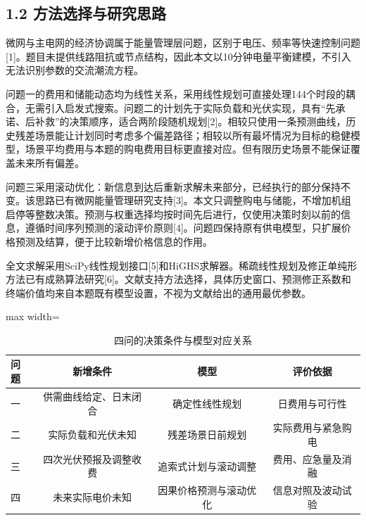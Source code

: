 \documentclass[UTF8,a4paper,zihao=-4,fontset=windows]{ctexart}
\begin{document}
\subsection{1.2 方法选择与研究思路}
微网与主电网的经济协调属于能量管理层问题，区别于电压、频率等快速控制问题[1]。题目未提供线路阻抗或节点结构，因此本文以10分钟电量平衡建模，不引入无法识别参数的交流潮流方程。
\par
问题一的费用和储能动态均为线性关系，采用线性规划可直接处理144个时段的耦合，无需引入启发式搜索。问题二的计划先于实际负载和光伏实现，具有“先承诺、后补救”的决策顺序，适合两阶段随机规划[2]。相较只使用一条预测曲线，历史残差场景能让计划同时考虑多个偏差路径；相较以所有最坏情况为目标的稳健模型，场景平均费用与本题的购电费用目标更直接对应。但有限历史场景不能保证覆盖未来所有偏差。
\par
问题三采用滚动优化：新信息到达后重新求解未来部分，已经执行的部分保持不变。该思路已有微网能量管理研究支持[3]。本文只调整购电与储能，不增加机组启停等整数决策。预测与权重选择均按时间先后进行，仅使用决策时刻以前的信息，遵循时间序列预测的滚动评价原则[4]。问题四保持原有供电模型，只扩展价格预测及结算，便于比较新增价格信息的作用。
\par
全文求解采用SciPy线性规划接口[5]和HiGHS求解器。稀疏线性规划及修正单纯形方法已有成熟算法研究[6]。文献支持方法选择，具体历史窗口、预测修正系数和终端价值均来自本题既有模型设置，不视为文献给出的通用最优参数。
\par
\begin{table}[H]\centering
\fontsize{9.5}{12}\selectfont\setlength{\tabcolsep}{4pt}\renewcommand{\arraystretch}{1.12}
\begin{adjustbox}{max width=\linewidth}\begin{tabular}{lccc}\toprule
\textbf{问题} & \textbf{新增条件} & \textbf{模型} & \textbf{评价依据}\\\midrule
一 & 供需曲线给定、日末闭合 & 确定性线性规划 & 日费用与可行性\\
二 & 实际负载和光伏未知 & 残差场景日前规划 & 实际费用与紧急购电\\
三 & 四次光伏预报及调整收费 & 追索式计划与滚动调整 & 费用、应急量及消融\\
四 & 未来实际电价未知 & 因果价格预测与滚动优化 & 信息对照及波动试验\\
\bottomrule\end{tabular}\end{adjustbox}
\caption{四问的决策条件与模型对应关系}
\end{table}
\end{document}
